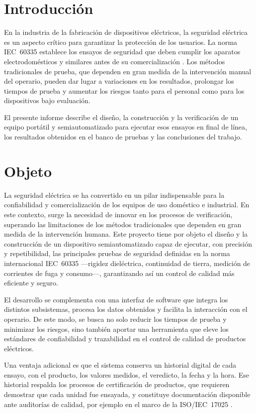 \section{Introducción}
\label{sec:introduccion}

En la industria de la fabricación de dispositivos eléctricos, la seguridad
eléctrica es un aspecto crítico para garantizar la protección de los usuarios.
La norma IEC~60335 establece los ensayos de seguridad que deben cumplir los
aparatos electrodomésticos y similares antes de su comercialización
\cite{iec60335}. Los métodos tradicionales de prueba, que dependen en gran medida
de la intervención manual del operario, pueden dar lugar a variaciones en los
resultados, prolongar los tiempos de prueba y aumentar los riesgos tanto para el
personal como para los dispositivos bajo evaluación.

El presente informe describe el diseño, la construcción y la verificación de un
equipo portátil y semiautomatizado para ejecutar esos ensayos en final de línea,
los resultados obtenidos en el banco de pruebas y las conclusiones del trabajo.

\section{Objeto}
\label{sec:objeto}

La seguridad eléctrica se ha convertido en un pilar indispensable para la
confiabilidad y comercialización de los equipos de uso doméstico e industrial. En
este contexto, surge la necesidad de innovar en los procesos de verificación,
superando las limitaciones de los métodos tradicionales que dependen en gran
medida de la intervención humana. Este proyecto tiene por objeto el diseño y la
construcción de un dispositivo semiautomatizado capaz de ejecutar, con precisión
y repetibilidad, las principales pruebas de seguridad definidas en la norma
internacional IEC~60335 ---rigidez dieléctrica, continuidad de tierra, medición
de corrientes de fuga y consumo---, garantizando así un control de calidad más
eficiente y seguro.

\vspace{0.3cm}\noindent El desarrollo se complementa con una interfaz de software
que integra los distintos subsistemas, procesa los datos obtenidos y facilita la
interacción con el operario. De este modo, se busca no solo reducir los tiempos de
prueba y minimizar los riesgos, sino también aportar una herramienta que eleve los
estándares de confiabilidad y trazabilidad en el control de calidad de productos
eléctricos.

\vspace{0.3cm}\noindent Una ventaja adicional es que el sistema conserva un
historial digital de cada ensayo, con el producto, los valores medidos, el
veredicto, la fecha y la hora. Ese historial respalda los procesos de
certificación de productos, que requieren demostrar que cada unidad fue
ensayada, y constituye documentación disponible ante auditorías de calidad, por
ejemplo en el marco de la ISO/IEC~17025 \cite{iso17025}.
